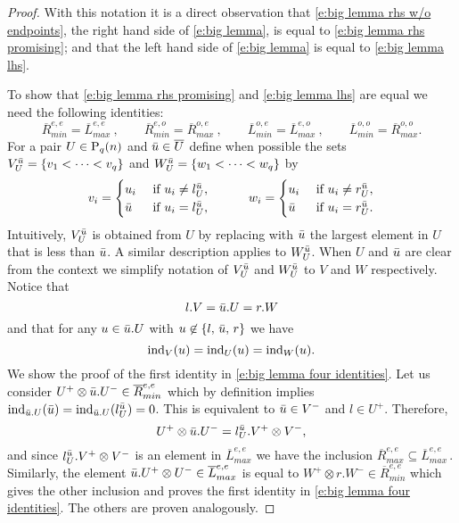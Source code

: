 \begin{proof}
	

	With this notation it is a direct observation that \eqref{e:big lemma rhs w/o endpoints}, the right hand side of \eqref{e:big lemma}, is equal to \eqref{e:big lemma rhs promising}; and that the left hand side of \eqref{e:big lemma} is equal to \eqref{e:big lemma lhs}.
	
	To show that \eqref{e:big lemma rhs promising} and \eqref{e:big lemma lhs} are equal we need the following identities:
	\begin{equation} \label{e:big lemma four identities}
	\overline{R}_{min}^{e,e} = \overline{L}_{max}^{e,e}\ , \qquad
	\overline{R}_{min}^{e,o} = \overline{R}_{max}^{o,e}\ , \qquad 
	\overline{L}_{min}^{o,e} = \overline{L}_{max}^{e,o}\ , \qquad
	\overline{L}_{min}^{o,o} = \overline{R}_{max}^{o,o}.
	\end{equation}
	For a pair $U \in \P_q(n)$ and $\bu \in \overline{U}$ define when possible the sets $V^\bu_U = \{v_1 < \cdots < v_q\}$ and $W_U^\bu = \{w_1 < \cdots < w_q\}$ by
	\begin{align*}
	v_i = 
	\begin{cases}
	u_i & \text{ if } u_i \neq l_U^\bu, \\
	\bu	& \text{ if } u_i = l_U^\bu,
	\end{cases}
	\qquad \quad
	w_i = 
	\begin{cases}
	u_i & \text{ if } u_i \neq r_U^\bu, \\
	\bu	& \text{ if } u_i = r_U^\bu.
	\end{cases}
	\end{align*}
	Intuitively, $V_U^\bu$ is obtained from $U$ by replacing with $\bu$ the largest element in $U$ that is less than $\bu$.
	A similar description applies to $W_U^\bu$.
	When $U$ and $\bu$ are clear from the context we simplify notation of $V^\bu_U$ and $W^\bu_U$ to $V$ and $W$ respectively.
	Notice that
	\begin{equation*}
	l.V = \bu.U = r.W
	\end{equation*}
	and that for any $u \in \bu.U$ with $u \not \in \{l,\, \bu,\, r\}$ we have
	\begin{equation*}
	\ind_{V}(u) = \ind_{U}(u) = \ind_{W}(u).
	\end{equation*}
	We show the proof of the first identity in \eqref{e:big lemma four identities}.
	Let us consider $U^+ \otimes \bu.U^- \in \overline{R}_{min}^{e, e}$ which by definition implies $\ind_{\bu.U}(\bu) = \ind_{\bu.U}(l_{U}^\bu) = 0$.
	This is equivalent to $\bu \in V^-$ and $l \in U^+$.
	Therefore, 
	\begin{equation*}
	U^+ \otimes \bu.U^- =  l_{U}^\bu.V^+ \otimes V^-,
	\end{equation*}
	and since $l_{U}^\bu.V^+ \otimes V^-$ is an element in $\overline{L}_{max}^{e,e}$ we have the inclusion $\overline{R}_{max}^{e,e} \subseteq \overline{L}_{max}^{e,e}$\,.
	Similarly, the element $\bu.U^+ \otimes U^- \in \overline{L}_{max}^{e,e}$ is equal to $W^+ \otimes r.W^- \in \overline{R}_{min}^{e,e}$ which gives the other inclusion and proves the first identity in \eqref{e:big lemma four identities}.
	The others are proven analogously.
	

\end{proof}
